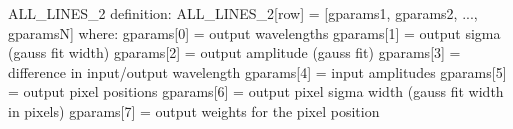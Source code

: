 \begin{minipage}{\textwidth}
\begin{pythondocstring}
ALL_LINES_2 definition:
    ALL_LINES_2[row] = [gparams1, gparams2, ..., gparamsN]
                where:
                    gparams[0] = output wavelengths
                    gparams[1] = output sigma (gauss fit width)
                    gparams[2] = output amplitude (gauss fit)
                    gparams[3] = difference in input/output wavelength
                    gparams[4] = input amplitudes
                    gparams[5] = output pixel positions
                    gparams[6] = output pixel sigma width
                                      (gauss fit width in pixels)
                    gparams[7] = output weights for the pixel position
\end{pythondocstring}
\end{minipage}

